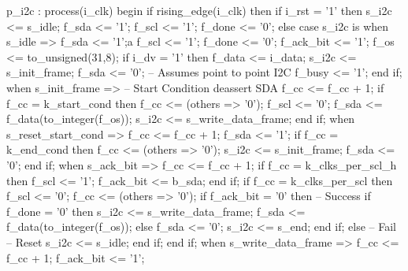 \begin{VHDLlisting}[tabsize=4]
    p_i2c : process(i_clk)
    begin
        if rising_edge(i_clk) then
            if i_rst = '1' then
                s_i2c <= s_idle;
                f_sda <= '1';
                f_scl <= '1';
                f_done <= '0';
            else
                case s_i2c is
                    when s_idle => 
                        f_sda <= '1';a
                        f_scl <= '1';
                        f_done <= '0';
                        f_ack_bit <= '1';
                        f_os <= to_unsigned(31,8);
                        if i_dv = '1' then
                            f_data <= i_data;
                            s_i2c <= s_init_frame;
                            f_sda <= '0'; -- Assumes point to point I2C
                            f_busy <= '1';
                        end if;
                    when s_init_frame => 
                        -- Start Condition deassert SDA
                        f_cc <= f_cc + 1;
                        if f_cc = k_start_cond then
                            f_cc <= (others => '0');
                            f_scl <= '0';
                            f_sda <= f_data(to_integer(f_os));
                            s_i2c <= s_write_data_frame;
                        end if;
                    when s_reset_start_cond => 
                        f_cc <= f_cc + 1;
                        f_sda <= '1';
                        if f_cc = k_end_cond then
                            f_cc <= (others => '0');
                            s_i2c <= s_init_frame;
                            f_sda <= '0';
                        end if;
                    when s_ack_bit => 
                        f_cc <= f_cc + 1;
                        if f_cc = k_clks_per_scl_h then
                            f_scl <= '1';
                            f_ack_bit <= b_sda;
                        end if; 
                        if f_cc = k_clks_per_scl then
                            f_scl <= '0';
                            f_cc <= (others => '0');
                            if f_ack_bit = '0' then
                                -- Success
                                if f_done = '0' then
                                    s_i2c <= s_write_data_frame;
                                    f_sda <= f_data(to_integer(f_os));
                                else
                                    f_sda <= '0';
                                    s_i2c <= s_end;
                                end if;
                            else
                                -- Fail -- Reset
                                s_i2c <= s_idle;
                            end if;
                        end if;
                    when s_write_data_frame => 
                        f_cc <= f_cc + 1;
                        f_ack_bit <= '1';
						

\end{VHDLlisting}
